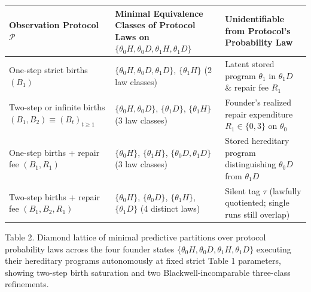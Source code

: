 \documentclass[11pt,a4paper]{article}
\newcounter{none}
\begin{document}

{\def\LTcaptype{none} %
\begin{longtable}[]{@{}
  >{\raggedright\arraybackslash}p{}
  >{\raggedright\arraybackslash}p{}
  >{\raggedright\arraybackslash}p{}@{}}
\toprule\noalign{}
\begin{minipage}[b]{\linewidth}\raggedright
Observation Protocol \(\mathcal{P}\)
\end{minipage} & \begin{minipage}[b]{\linewidth}\raggedright
Minimal Equivalence Classes of Protocol Laws on
\(\{\theta_0 H, \theta_0 D, \theta_1 H, \theta_1 D\}\)
\end{minipage} & \begin{minipage}[b]{\linewidth}\raggedright
Unidentifiable from Protocol's Probability Law
\end{minipage} \\
\midrule\noalign{}
\endhead
\bottomrule\noalign{}
\endlastfoot
One-step strict births \((B_1)\) &
\(\{\theta_0 H, \theta_0 D, \theta_1 D\}\), \(\{\theta_1 H\}\) (2 law
classes) & Latent stored program \(\theta_1\) in \(\theta_1 D\) \&
repair fee \(R_1\) \\
Two-step or infinite births \((B_1, B_2) \equiv (B_t)_{t\ge 1}\) &
\(\{\theta_0 H, \theta_0 D\}\), \(\{\theta_1 D\}\), \(\{\theta_1 H\}\)
(3 law classes) & Founder's realized repair expenditure
\(R_1 \in \{0,3\}\) on \(\theta_0\) \\
One-step births + repair fee \((B_1, R_1)\) & \(\{\theta_0 H\}\),
\(\{\theta_1 H\}\), \(\{\theta_0 D, \theta_1 D\}\) (3 law classes) &
Stored hereditary program distinguishing \(\theta_0 D\) from
\(\theta_1 D\) \\
Two-step births + repair fee \((B_1, B_2, R_1)\) & \(\{\theta_0 H\}\),
\(\{\theta_0 D\}\), \(\{\theta_1 H\}\), \(\{\theta_1 D\}\) (4 distinct
laws) & Silent tag \(\tau\) (lawfully quotiented; single runs still
overlap) \\
\end{longtable}
}

Table 2. Diamond lattice of minimal predictive partitions over protocol
probability laws across the four founder states
\(\{\theta_0 H, \theta_0 D, \theta_1 H, \theta_1 D\}\) executing their
hereditary programs autonomously at fixed strict Table 1 parameters,
showing two-step birth saturation and two Blackwell-incomparable
three-class refinements.
\end{document}
